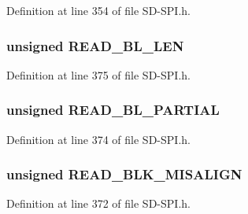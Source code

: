 Definition at line 354 of file S\+D-\/\+S\+P\+I.\+h.

\hypertarget{union_c_s_d_a51734dc42fcdda366768735e57044f42}{}
\subsubsection[{R\+E\+A\+D\+\_\+\+B\+L\+\_\+\+L\+E\+N}]{\setlength{\rightskip}{0pt plus 5cm}unsigned R\+E\+A\+D\+\_\+\+B\+L\+\_\+\+L\+E\+N}\label{union_c_s_d_a51734dc42fcdda366768735e57044f42}


Definition at line 375 of file S\+D-\/\+S\+P\+I.\+h.

\hypertarget{union_c_s_d_aab933cb97ec6db2a716f43f8b7d4d1a4}{}
\subsubsection[{R\+E\+A\+D\+\_\+\+B\+L\+\_\+\+P\+A\+R\+T\+I\+A\+L}]{\setlength{\rightskip}{0pt plus 5cm}unsigned R\+E\+A\+D\+\_\+\+B\+L\+\_\+\+P\+A\+R\+T\+I\+A\+L}\label{union_c_s_d_aab933cb97ec6db2a716f43f8b7d4d1a4}


Definition at line 374 of file S\+D-\/\+S\+P\+I.\+h.

\hypertarget{union_c_s_d_a89910eec988a2ad957d8027dc5cd55f3}{}
\subsubsection[{R\+E\+A\+D\+\_\+\+B\+L\+K\+\_\+\+M\+I\+S\+A\+L\+I\+G\+N}]{\setlength{\rightskip}{0pt plus 5cm}unsigned R\+E\+A\+D\+\_\+\+B\+L\+K\+\_\+\+M\+I\+S\+A\+L\+I\+G\+N}\label{union_c_s_d_a89910eec988a2ad957d8027dc5cd55f3}


Definition at line 372 of file S\+D-\/\+S\+P\+I.\+h.

\hypertarget{union_c_s_d_a4b738029ab14d09fb361dad2e4994434}{}
